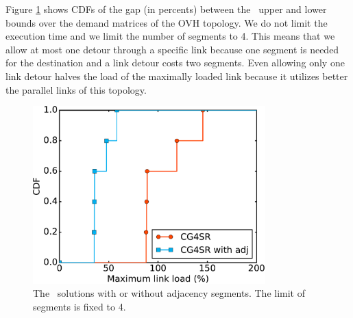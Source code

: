 Figure \ref{fig:adjacency:upperbound} shows CDFs of the gap (in percents)
between the \name~upper and lower bounds over the demand matrices of the OVH topology.
We do not limit the execution time and we limit the number of segments to 4.
This means that we allow at most one detour through a specific link
because one segment is needed for the destination and a link detour costs two segments.
Even allowing only one link detour halves the load of the maximally loaded link
because it utilizes better the parallel links of this topology.

\begin{figure}
	\centering
	\includegraphics[width=0.8\textwidth]{images/solver_adj_upper_bound.OVH_paper.cdfs.pdf}
	\caption{The \name~solutions with or without adjacency segments. The limit of segments is fixed to 4.}
	\label{fig:adjacency:upperbound}
\end{figure}

